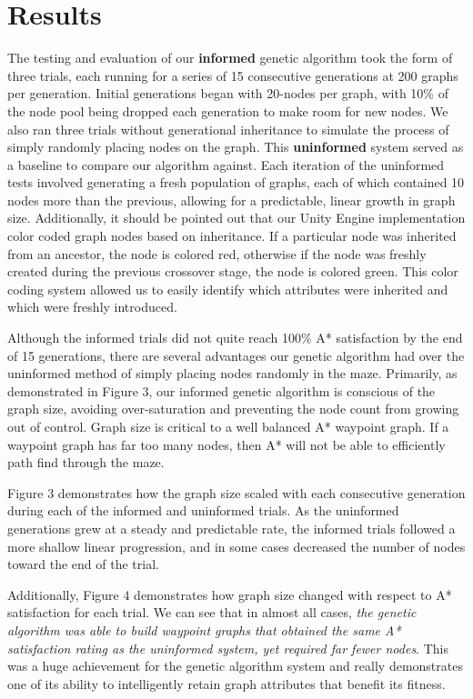 
\section{Results}

	The testing and evaluation of our \textbf{informed} genetic algorithm took the form of three trials, each running for a series of 15 consecutive generations at 200 graphs per generation. Initial generations began with 20-nodes per graph, with 10\% of the node pool being dropped each generation to make room for new nodes. We also ran three trials without generational inheritance to simulate the process of simply randomly placing nodes on the graph. This \textbf{uninformed} system served as a baseline to compare our algorithm against. Each iteration of the uninformed tests involved generating a fresh population of graphs, each of which contained 10 nodes more than the previous, allowing for a predictable, linear growth in graph size. Additionally, it should be pointed out that our Unity Engine implementation color coded graph nodes based on inheritance. If a particular node was inherited from an ancestor, the node is colored red, otherwise if the node was freshly created during the previous crossover stage, the node is colored green. This color coding system allowed us to easily identify which attributes were inherited and which were freshly introduced.
	
	Although the informed trials did not quite reach 100\% A* satisfaction by the end of 15 generations, there are several advantages our genetic algorithm had over the uninformed method of simply placing nodes randomly in the maze. Primarily, as demonstrated in Figure 3, our informed genetic algorithm is conscious of the graph size, avoiding over-saturation and preventing the node count from growing out of control. Graph size is critical to a well balanced A* waypoint graph. If a waypoint graph has far too many nodes, then A* will not be able to efficiently path find through the maze.
	
	
	Figure 3 demonstrates how the graph size scaled with each consecutive generation during each of the informed and uninformed trials. As the uninformed generations grew at a steady and predictable rate, the informed trials followed a more shallow linear progression, and in some cases decreased the number of nodes toward the end of the trial.
	
	Additionally, Figure 4 demonstrates how graph size changed with respect to A* satisfaction for each trial. We can see that in almost all cases, \textit{the genetic algorithm was able to build waypoint graphs that obtained the same A* satisfaction rating as the uninformed system, yet required far fewer nodes}. This was a huge achievement for the genetic algorithm system and really demonstrates one of its ability to intelligently retain graph attributes that benefit its fitness.
	
